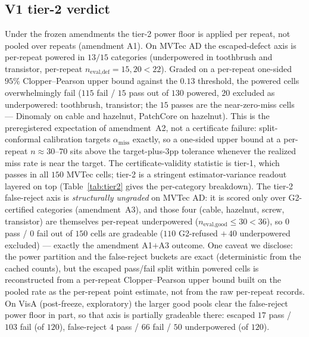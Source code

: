 \documentclass[preprint,11pt]{elsarticle}
\begin{document}
\subsection{V1 tier-2 verdict}
\label{sec:tier2verdict}

Under the frozen amendments the tier-2 power floor is applied per repeat, not pooled over repeats
(amendment A1). On MVTec AD the escaped-defect axis is per-repeat powered in $13/15$ categories
(underpowered in toothbrush and transistor, per-repeat $n_{\text{eval,def}}=15,20<22$). Graded on a
per-repeat one-sided $95\%$ Clopper--Pearson upper bound against the $0.13$ threshold, the powered
cells overwhelmingly fail ($115$ fail / $15$ pass out of $130$ powered, $20$ excluded as
underpowered: toothbrush, transistor; the $15$ passes are the near-zero-miss cells --- Dinomaly on
cable and hazelnut, PatchCore on hazelnut). This is the preregistered expectation of amendment~A2,
not a certificate failure: split-conformal calibration targets $\alpha_{\text{miss}}$ exactly, so a
one-sided upper bound at a per-repeat $n\approx30$--$70$ sits above the target-plus-$3$pp tolerance
whenever the realized miss rate is near the target. The certificate-validity statistic is tier-1,
which passes in all $150$ MVTec cells; tier-2 is a stringent estimator-variance readout layered on
top (Table~\ref{tab:tier2} gives the per-category breakdown). The tier-2 false-reject axis is
\emph{structurally ungraded} on
MVTec AD: it is scored only over G2-certified categories (amendment~A3), and those four (cable,
hazelnut, screw, transistor) are themselves per-repeat underpowered ($n_{\text{eval,good}}\le30<36$),
so $0$ pass / $0$ fail out of $150$ cells are gradeable ($110$ G2-refused $+\,40$ underpowered
excluded) --- exactly the amendment A1$+$A3 outcome. One caveat we disclose: the
power partition and the false-reject buckets are exact (deterministic from the cached counts), but
the escaped pass/fail split within powered cells is reconstructed from a per-repeat Clopper--Pearson
upper bound built on the pooled rate as the per-repeat point estimate, not from the raw per-repeat
records. On VisA (post-freeze, exploratory) the larger good pools clear the false-reject power floor
in part, so that axis is partially gradeable there: escaped $17$ pass / $103$ fail (of $120$), false-reject
$4$ pass / $66$ fail / $50$ underpowered (of $120$).
\end{document}
